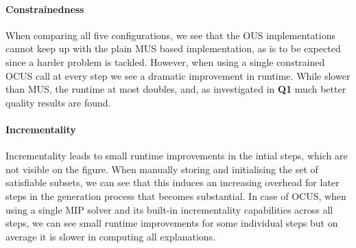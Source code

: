 \paragraph{Constrainedness}
When comparing all five configurations, we see that the OUS implementations cannot keep up with the plain MUS based implementation, as is to be expected since a harder problem is tackled.
However, when using a single constrained OCUS call at every step we see a dramatic improvement in runtime. While slower than MUS, the runtime at most doubles, and, as investigated in \textbf{Q1} much better quality results are found. %



\paragraph{Incrementality}

Incrementality leads to small runtime improvements in the intial steps, which are not visible on the figure. When manually storing and initialising the set of satisfiable subsets, we can see that this induces an increasing overhead for later steps in the generation process that becomes substantial. In case of OCUS, when using a single MIP solver and its built-in incrementality capabilities across all steps, we can see small runtime improvements for some individual steps but on average it is slower in computing all explanations.

